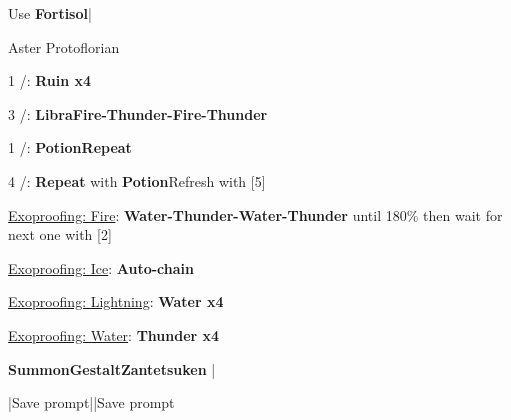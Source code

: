 \begin{mainlist}
	\item Use \textbf{Fortisol}|\skip
\end{mainlist}
\begin{fight}{Aster Protoflorian}
	\item [1] \com/\rav: \textbf{Ruin x4}
	\item [3] \rav/\syn: \textbf{Libra}\to \textbf{Fire-Thunder-Fire-Thunder}
	\item [1] \com/\rav: \textbf{\textbf{Potion}}\to \textbf{Repeat}
	\item [4] \rav/\rav: \textbf{Repeat} with \textbf{Potion}\to Refresh with [5]
	\item \underline{Exoproofing: Fire}: \textbf{Water-Thunder-Water-Thunder} until 180\% then wait for next one with [2]
	\item \underline{Exoproofing: Ice}: \textbf{Auto-chain}
	\item \underline{Exoproofing: Lightning}: \textbf{Water x4}
	\item \underline{Exoproofing: Water}: \textbf{Thunder x4}
	\item \textbf{Summon}\to \textbf{Gestalt}\to \textbf{Zantetsuken} |\skip
\end{fight}
\begin{mainlist}
	\item \skip|Save prompt||Save prompt
\end{mainlist}
